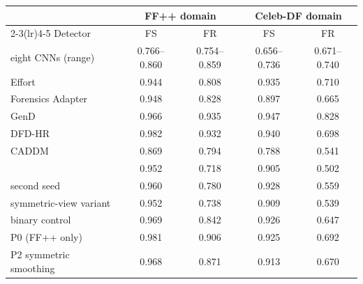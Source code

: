 \begin{tabular}{@{}l cc cc@{}}
\toprule
 & \multicolumn{2}{c}{FF++ domain} & \multicolumn{2}{c}{Celeb-DF domain} \\
\cmidrule(lr){2-3}\cmidrule(lr){4-5}
Detector & FS & FR & FS & FR \\
\midrule
eight CNNs (range) & 0.766--0.860 & 0.754--0.859 & 0.656--0.736 & 0.671--0.740 \\
Effort~\cite{effort} & 0.944 & 0.808 & 0.935 & 0.710 \\
Forensics Adapter~\cite{forensicsadapter} & 0.948 & 0.828 & 0.897 & 0.665 \\
GenD~\cite{gend2026} & 0.966 & 0.935 & 0.947 & 0.828 \\
DFD-HR~\cite{dfdhr2026} & 0.982 & 0.932 & 0.940 & 0.698 \\
CADDM~\cite{caddm} & 0.869 & 0.794 & 0.788 & 0.541 \\
\midrule
\ours{} & 0.952 & 0.718 & 0.905 & 0.502 \\
\quad second seed & 0.960 & 0.780 & 0.928 & 0.559 \\
\quad symmetric-view variant & 0.952 & 0.738 & 0.909 & 0.539 \\
binary control & 0.969 & 0.842 & 0.926 & 0.647 \\
P0 (FF++ only) & 0.981 & 0.906 & 0.925 & 0.692 \\
P2 symmetric smoothing & 0.968 & 0.871 & 0.913 & 0.670 \\
\bottomrule
\end{tabular}
